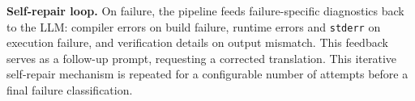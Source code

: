 \documentclass{article}
\newcommand{\verifyfail}{\textsc{VERIFY\_FAIL}}
\begin{document}


\textbf{Self-repair loop.} On failure, the pipeline feeds failure-specific diagnostics back to the LLM: compiler errors on build failure, runtime errors and \texttt{stderr} on execution failure, and verification details on output mismatch. This feedback serves as a follow-up prompt, requesting a corrected translation. This iterative self-repair mechanism is repeated for a configurable number of attempts before a final failure classification.
\end{document}
